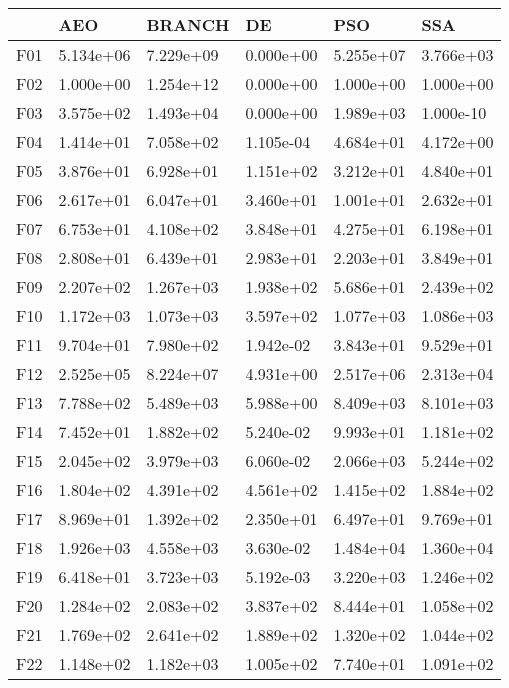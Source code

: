 \begin{tabular}{llllll}
\toprule
{} &        AEO &     BRANCH &         DE &        PSO &        SSA \\
\midrule
F01  &  5.134e+06 &  7.229e+09 &  0.000e+00 &  5.255e+07 &  3.766e+03 \\
F02  &  1.000e+00 &  1.254e+12 &  0.000e+00 &  1.000e+00 &  1.000e+00 \\
F03  &  3.575e+02 &  1.493e+04 &  0.000e+00 &  1.989e+03 &  1.000e-10 \\
F04  &  1.414e+01 &  7.058e+02 &  1.105e-04 &  4.684e+01 &  4.172e+00 \\
F05  &  3.876e+01 &  6.928e+01 &  1.151e+02 &  3.212e+01 &  4.840e+01 \\
F06  &  2.617e+01 &  6.047e+01 &  3.460e+01 &  1.001e+01 &  2.632e+01 \\
F07  &  6.753e+01 &  4.108e+02 &  3.848e+01 &  4.275e+01 &  6.198e+01 \\
F08  &  2.808e+01 &  6.439e+01 &  2.983e+01 &  2.203e+01 &  3.849e+01 \\
F09  &  2.207e+02 &  1.267e+03 &  1.938e+02 &  5.686e+01 &  2.439e+02 \\
F10  &  1.172e+03 &  1.073e+03 &  3.597e+02 &  1.077e+03 &  1.086e+03 \\
F11  &  9.704e+01 &  7.980e+02 &  1.942e-02 &  3.843e+01 &  9.529e+01 \\
F12  &  2.525e+05 &  8.224e+07 &  4.931e+00 &  2.517e+06 &  2.313e+04 \\
F13  &  7.788e+02 &  5.489e+03 &  5.988e+00 &  8.409e+03 &  8.101e+03 \\
F14  &  7.452e+01 &  1.882e+02 &  5.240e-02 &  9.993e+01 &  1.181e+02 \\
F15  &  2.045e+02 &  3.979e+03 &  6.060e-02 &  2.066e+03 &  5.244e+02 \\
F16  &  1.804e+02 &  4.391e+02 &  4.561e+02 &  1.415e+02 &  1.884e+02 \\
F17  &  8.969e+01 &  1.392e+02 &  2.350e+01 &  6.497e+01 &  9.769e+01 \\
F18  &  1.926e+03 &  4.558e+03 &  3.630e-02 &  1.484e+04 &  1.360e+04 \\
F19  &  6.418e+01 &  3.723e+03 &  5.192e-03 &  3.220e+03 &  1.246e+02 \\
F20  &  1.284e+02 &  2.083e+02 &  3.837e+02 &  8.444e+01 &  1.058e+02 \\
F21  &  1.769e+02 &  2.641e+02 &  1.889e+02 &  1.320e+02 &  1.044e+02 \\
F22  &  1.148e+02 &  1.182e+03 &  1.005e+02 &  7.740e+01 &  1.091e+02 \\

\end{tabular}
